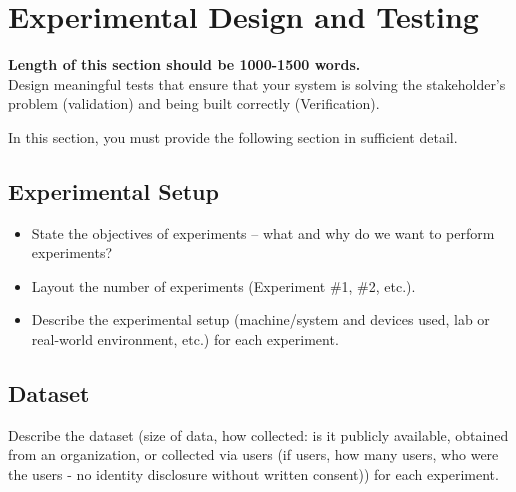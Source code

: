 \documentclass[12pt]{article}
\begin{document}
\section{Experimental Design and Testing}\label{chap:results}

\textbf{Length of this section should be 1000-1500 words.}\\

Design meaningful tests that ensure that your system is solving the stakeholder’s problem (validation) and being built correctly (Verification). 

In this section, you must provide the following section in sufficient detail.
\subsection{Experimental Setup}\label{sec:exp_setup}
    \begin{itemize}
        \item State the objectives of experiments – what and why do we want to perform experiments?
        \item Layout the number of experiments (Experiment \#1, \#2, etc.).
        \item Describe the experimental setup (machine/system and devices used, lab or real-world environment, etc.) for each experiment.
    \end{itemize}
\subsection{Dataset}\label{sec:dataset}
        Describe the dataset (size of data, how collected: is it publicly available, obtained from an organization, or collected via users (if users, how many users, who were the users - no identity disclosure without written consent)) for each experiment. 
\end{document}
